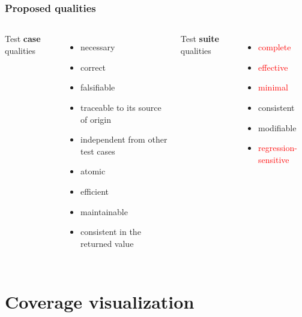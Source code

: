 \documentclass{beamer}
\begin{document}
\begin{frame}
  \frametitle{Proposed qualities}
\begin{columns}[t]
\centering \large Test \textbf{case} qualities
\begin{itemize}
  \item necessary
  \item correct
  \item falsifiable
  \item traceable to its source of origin
  \item independent from other test cases
  \item atomic
  \item efficient
  \item maintainable
  \item consistent in the returned value
\end{itemize}
\centering \large Test \textbf{suite} qualities
\begin{itemize}
  \item \textcolor{red}{complete}
  \item \textcolor{red}{effective}
  \item \textcolor{red}{minimal}
  \item consistent
  \item modifiable
  \item \textcolor{red}{regression-sensitive}
\end{itemize}
\end{columns}
\end{frame}
 
\section{Coverage visualization}
\end{document}
